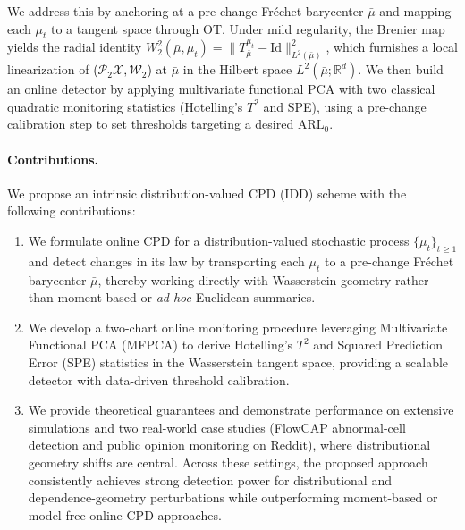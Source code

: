 \documentclass{article}
\newcommand{\rev}[1]{\textcolor{black}{#1}}
\theoremstyle{plain}
\theoremstyle{definition}
\theoremstyle{remark}
\begin{document}
We address this by anchoring at a pre-change Fr\'echet barycenter $\bar{\mu}$ and mapping each $\mu_t$ to a tangent space through OT.
Under mild regularity, the Brenier map yields the radial identity
$W_2^2(\bar{\mu},\mu_t)=\|T_{\bar\mu}^{\mu_t}-\mathrm{Id}\|_{L^2(\bar\mu)}^2$,
which furnishes a local linearization of \rev{($\mathcal{P}_2{\mathcal{X}},\mathcal W_2$)} at $\bar\mu$ in the Hilbert space $L^2(\bar\mu;\mathbb R^d)$.
We then build an online detector by applying multivariate functional PCA with two classical quadratic monitoring statistics (Hotelling's $T^2$ and SPE), using a pre-change calibration step to set thresholds targeting a desired $\mathrm{ARL}_0$.

\paragraph{Contributions.}
We propose an intrinsic distribution-valued CPD (IDD) scheme with the following contributions:
\begin{enumerate}
    \item %
    We formulate online CPD for a distribution-valued stochastic process $\{\mu_t\}_{t\ge 1}$ and detect changes in its law by transporting each $\mu_t$ to a pre-change Fr\'echet barycenter $\bar{\mu}$, thereby working directly with Wasserstein geometry rather than moment-based or \textit{ad hoc} Euclidean summaries.
    \item %
    We develop a two-chart online monitoring procedure leveraging Multivariate Functional PCA (MFPCA) to derive Hotelling's $T^2$ and Squared Prediction Error (SPE) statistics in the Wasserstein tangent space, providing a scalable detector with data-driven threshold calibration.
    \item %
    We provide theoretical guarantees and demonstrate performance on extensive simulations and two real-world case studies (FlowCAP abnormal-cell detection and public opinion monitoring on Reddit), where distributional geometry shifts are central. Across these settings, the proposed approach consistently achieves strong detection power for distributional and dependence-geometry perturbations while outperforming moment-based or model-free online CPD approaches.
\end{enumerate}
\end{document}
